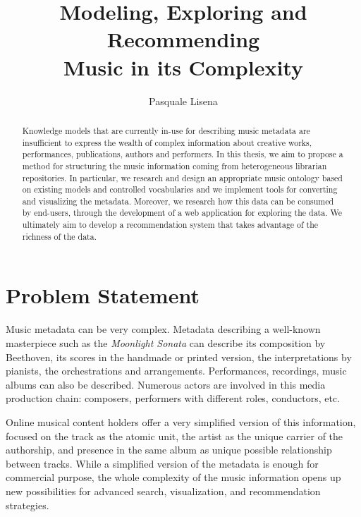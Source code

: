 \documentclass{llncs}
\begin{document}
\title{Modeling, Exploring and Recommending\\ Music in its Complexity}

\author{Pasquale Lisena}

\maketitle


\begin{abstract}
Knowledge models that are currently in-use for describing music metadata are insufficient to express the wealth of complex information about creative works, performances, publications, authors and performers. In this thesis, we aim to propose a method for structuring the music information coming from heterogeneous librarian repositories. In particular, we research and design an appropriate music ontology based on existing models and controlled vocabularies and we implement tools for converting and visualizing the metadata. Moreover, we research how this data can be consumed by end-users, through the development of a web application for exploring the data. We ultimately aim to develop a recommendation system that takes advantage of the richness of the data.

\end{abstract}


\section{Problem Statement}
\label{sec:problem}
Music metadata can be very complex. Metadata describing a well-known masterpiece such as the \textit{Moonlight Sonata} can describe its composition by Beethoven, its scores in the handmade or printed version, the interpretations by pianists, the orchestrations and arrangements. Performances, recordings, music albums can also be described. Numerous actors are involved in this media production chain: composers, performers with different roles, conductors, etc.

Online musical content holders offer a very simplified version of this information, focused on the track as the atomic unit, the artist as the unique carrier of the authorship, and presence in the same album as unique possible relationship between tracks. While a simplified version of the metadata is enough for commercial purpose, the whole complexity of the music information opens up new possibilities for advanced search, visualization, and recommendation strategies.
\end{document}
